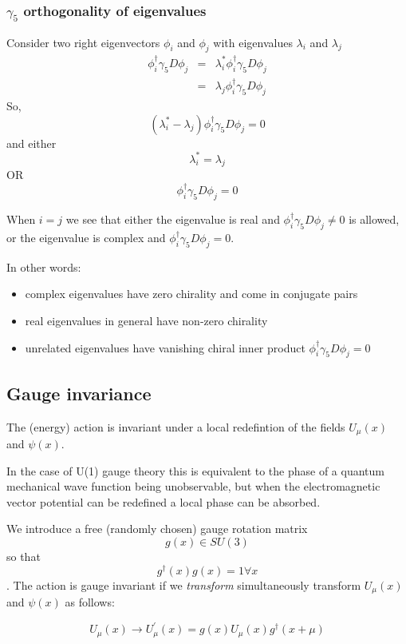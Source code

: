 \documentclass[letter,10pt]{report}
\begin{document}
\subsubsection{$\gamma_5$ orthogonality of eigenvalues}

Consider two right eigenvectors $\phi_i$ and $\phi_j$ with eigenvalues $\lambda_i$ and $\lambda_j$
\begin{eqnarray}
  \phi_i^\dagger \gamma_5 D \phi_j &=& \lambda_i^\ast \phi_i^\dagger \gamma_5 D \phi_j\\
  &=& \lambda_j \phi_i^\dagger \gamma_5 D \phi_j
\end{eqnarray}
So,
$$
(\lambda_i^\ast - \lambda_j)   \phi_i^\dagger \gamma_5 D \phi_j = 0
$$
and either
$$
\lambda_i^\ast = \lambda_j 
$$
OR
$$
\phi_i^\dagger \gamma_5 D \phi_j = 0
$$

When $i=j$ we see that either the eigenvalue is real and $\phi_i^\dagger \gamma_5 D \phi_j \ne 0$ is allowed,
or the eigenvalue is complex and $\phi_i^\dagger \gamma_5 D \phi_j = 0$.

In other words:
\begin{itemize}
\item complex eigenvalues have zero chirality and come in conjugate pairs
\item real eigenvalues in general have non-zero chirality
\item unrelated eigenvalues have vanishing chiral inner product $\phi_i^\dagger \gamma_5 D \phi_j = 0$
\end{itemize}

\subsection{Gauge invariance}

The (energy) action is invariant under a local redefintion of the fields $U_\mu(x)$ and $\psi(x)$.

In the case of U(1) gauge theory this is equivalent to the phase of a quantum mechanical wave function being unobservable,
but when the electromagnetic vector potential can be redefined a local phase can be absorbed.

We introduce a free (randomly chosen) gauge rotation matrix $$g(x) \in SU(3)$$ so that $$ g^\dagger(x) g(x) = 1 \forall x$$.
The action is gauge invariant if we \emph{transform} simultaneously transform $U_\mu(x)$ and $\psi(x)$ as follows:

$$U_\mu(x) \to U_\mu^\prime(x) = g(x) U_\mu(x) g^\dagger(x+\mu)$$
\end{document}
